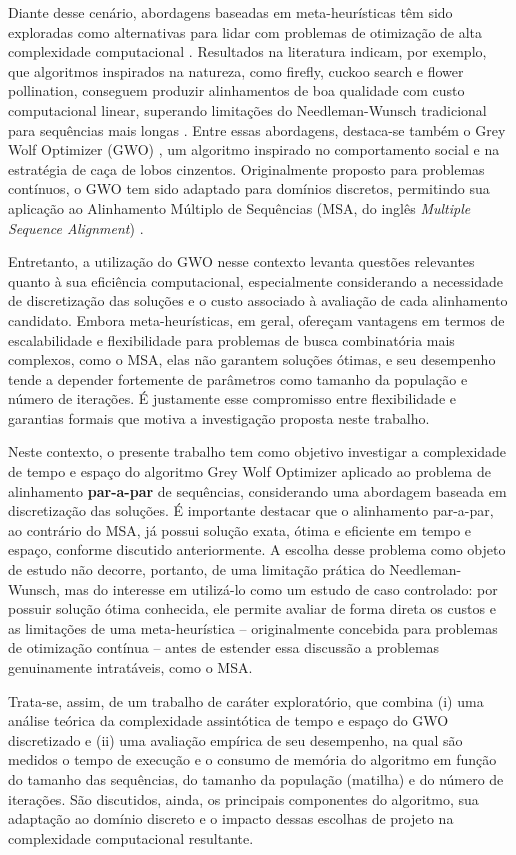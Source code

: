\documentclass[12pt]{article}
\begin{document}
Diante desse cenário, abordagens baseadas em meta-heurísticas têm sido exploradas como alternativas para lidar com
problemas de otimização de alta complexidade computacional \cite{geraldo}. Resultados na literatura indicam, por
exemplo, que algoritmos inspirados na natureza, como firefly, cuckoo search e flower pollination, conseguem produzir
alinhamentos de boa qualidade com custo computacional linear, superando limitações do Needleman-Wunsch tradicional para
sequências mais longas \cite{shahab}. Entre essas abordagens, destaca-se também o Grey Wolf Optimizer (GWO) \cite{gwo},
um algoritmo inspirado no comportamento social e na estratégia de caça de lobos cinzentos. Originalmente proposto para
problemas contínuos, o GWO tem sido adaptado para domínios discretos, permitindo sua aplicação ao Alinhamento Múltiplo
de Sequências (MSA, do inglês \textit{Multiple Sequence Alignment}) \cite{gwomsa}.

Entretanto, a utilização do GWO nesse contexto levanta questões relevantes quanto à sua eficiência computacional,
especialmente considerando a necessidade de discretização das soluções e o custo associado à avaliação de cada
alinhamento candidato. Embora meta-heurísticas, em geral, ofereçam vantagens em termos de escalabilidade e flexibilidade
para problemas de busca combinatória mais complexos, como o MSA, elas não garantem soluções ótimas, e seu desempenho
tende a depender fortemente de parâmetros como tamanho da população e número de iterações. É justamente esse
compromisso entre flexibilidade e garantias formais que motiva a investigação proposta neste trabalho.

Neste contexto, o presente trabalho tem como objetivo investigar a complexidade de tempo e espaço do algoritmo Grey
Wolf Optimizer aplicado ao problema de alinhamento \textbf{par-a-par} de sequências, considerando uma abordagem baseada
em discretização das soluções. É importante destacar que o alinhamento par-a-par, ao contrário do MSA, já possui
solução exata, ótima e eficiente em tempo e espaço, conforme discutido anteriormente. A escolha desse problema como
objeto de estudo não decorre, portanto, de uma limitação prática do Needleman-Wunsch, mas do interesse em utilizá-lo
como um estudo de caso controlado: por possuir solução ótima conhecida, ele permite avaliar de forma direta os custos e
as limitações de uma meta-heurística -- originalmente concebida para problemas de otimização contínua -- antes de
estender essa discussão a problemas genuinamente intratáveis, como o MSA.

Trata-se, assim, de um trabalho de caráter exploratório, que combina (i) uma análise teórica da complexidade
assintótica de tempo e espaço do GWO discretizado e (ii) uma avaliação empírica de seu desempenho, na qual são medidos
o tempo de execução e o consumo de memória do algoritmo em função do tamanho das sequências, do tamanho da população
(matilha) e do número de iterações. São discutidos, ainda, os principais componentes do algoritmo, sua adaptação ao
domínio discreto e o impacto dessas escolhas de projeto na complexidade computacional resultante.
\end{document}
